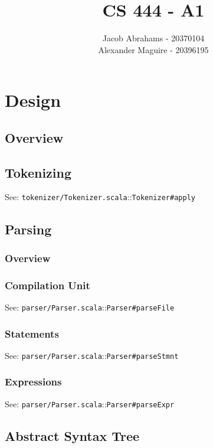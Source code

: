 \documentclass{article}
\title{CS 444 - A1}
\author{Jacob Abrahams - 20370104\\ Alexander Maguire - 20396195}
\begin{document}
\newcommand\type[1]{\texttt{#1}}
\renewcommand\value[1]{\texttt{#1}}
\newcommand\source[2]{See: \texttt{#1.scala}::\type{#2} \\}

\maketitle

\section{Design}


\subsection{Overview}


\subsection{Tokenizing}
\source{tokenizer/Tokenizer}{Tokenizer\#apply}




\subsection{Parsing}

\subsubsection{Overview}
\subsubsection{Compilation Unit}
\source{parser/Parser}{Parser\#parseFile}

\subsubsection{Statements}
\source{parser/Parser}{Parser\#parseStmnt}

\subsubsection{Expressions}
\source{parser/Parser}{Parser\#parseExpr}


\subsection{Abstract Syntax Tree}
\end{document}

